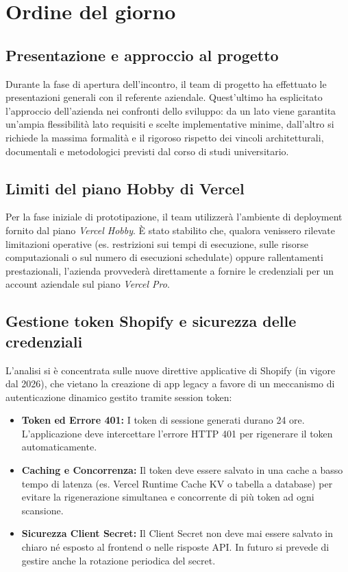 \newpage
\vspace{0.8cm}

\section{Ordine del giorno}

\subsection{Presentazione e approccio al progetto}
Durante la fase di apertura dell'incontro, il team di progetto ha effettuato le presentazioni generali con il referente aziendale. Quest'ultimo ha esplicitato l'approccio dell'azienda nei confronti dello sviluppo: da un lato viene garantita un'ampia flessibilità lato requisiti e scelte implementative minime, dall'altro si richiede la massima formalità e il rigoroso rispetto dei vincoli architetturali, documentali e metodologici previsti dal corso di studi universitario.

\subsection{Limiti del piano Hobby di Vercel}
Per la fase iniziale di prototipazione, il team utilizzerà l'ambiente di deployment fornito dal piano \textit{Vercel Hobby}. È stato stabilito che, qualora venissero rilevate limitazioni operative (es. restrizioni sui tempi di esecuzione, sulle risorse computazionali o sul numero di esecuzioni schedulate) oppure rallentamenti prestazionali, l'azienda provvederà direttamente a fornire le credenziali per un account aziendale sul piano \textit{Vercel Pro}.

\subsection{Gestione token Shopify e sicurezza delle credenziali}
L'analisi si è concentrata sulle nuove direttive applicative di Shopify (in vigore dal 2026), che vietano la creazione di app legacy a favore di un meccanismo di autenticazione dinamico gestito tramite session token:
\begin{itemize}
    \item \textbf{Token ed Errore 401:} I token di sessione generati durano 24 ore. L'applicazione deve intercettare l'errore HTTP 401 per rigenerare il token automaticamente.
    \item \textbf{Caching e Concorrenza:} Il token deve essere salvato in una cache a basso tempo di latenza (es. Vercel Runtime Cache KV o tabella a database) per evitare la rigenerazione simultanea e concorrente di più token ad ogni scansione.
    \item \textbf{Sicurezza Client Secret:} Il Client Secret non deve mai essere salvato in chiaro né esposto al frontend o nelle risposte API. In futuro si prevede di gestire anche la rotazione periodica del secret.
\end{itemize}

